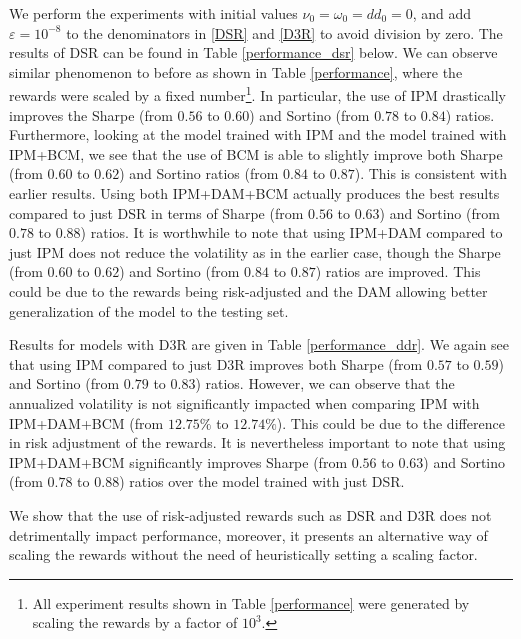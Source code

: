 \documentclass{article}
\begin{document}
We perform the experiments with initial values $\nu_0=\omega_0=dd_{0}=0$, and add $\varepsilon=10^{-8}$ to the denominators in \eqref{DSR} and \eqref{D3R} to avoid division by zero. The results of DSR can be found in Table \ref{performance_dsr} below. We can observe similar phenomenon to before as shown in Table \ref{performance}, where the rewards were scaled by a fixed number\footnote{All experiment results shown in Table \ref{performance} were generated by scaling the rewards by a factor of $10^3$.}. In particular, the use of IPM drastically improves the Sharpe (from $0.56$ to $0.60$) and Sortino (from $0.78$ to $0.84$) ratios. Furthermore, looking at the model trained with IPM and the model trained with IPM+BCM, we see that the use of BCM is able to slightly improve both Sharpe (from $0.60$ to $0.62$) and Sortino ratios (from $0.84$ to $0.87$). This is consistent with earlier results. Using both IPM+DAM+BCM actually produces the best results compared to just DSR in terms of Sharpe (from $0.56$ to $0.63$) and Sortino (from $0.78$ to $0.88$) ratios. It is worthwhile to note that using IPM+DAM compared to just IPM does not reduce the volatility as in the earlier case, though the Sharpe (from $0.60$ to $0.62$) and Sortino (from $0.84$ to $0.87$) ratios are improved. This could be due to the rewards being risk-adjusted and the DAM allowing better generalization of the model to the testing set.

Results for models with D3R are given in Table \ref{performance_ddr}. We again see that using IPM compared to just D3R improves both Sharpe (from $0.57$ to $0.59$) and Sortino (from $0.79$ to $0.83$) ratios. However, we can observe that the annualized volatility is not significantly impacted when comparing IPM with IPM+DAM+BCM (from $12.75\%$ to $12.74\%$). This could be due to the difference in risk adjustment of the rewards. It is nevertheless important to note that using IPM+DAM+BCM significantly improves Sharpe (from $0.56$ to $0.63$) and Sortino (from $0.78$ to $0.88$) ratios over the model trained with just DSR.

We show that the use of risk-adjusted rewards such as DSR and D3R does not detrimentally impact performance, moreover, it presents an alternative way of scaling the rewards without the need of heuristically setting a scaling factor. 
\end{document}
